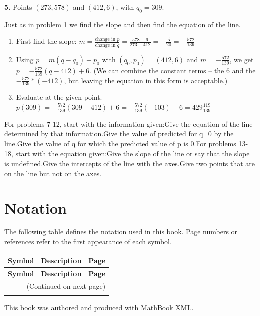 \documentclass[10pt,]{book}
\theoremstyle{plain}
\theoremstyle{definition}
\theoremstyle{definition}
\begin{document}
\par\smallskip
\noindent\textbf{5.}\quad{} Points \((273,578)\) and \((412,6)\), with \(q_0=309\).
%
\par\smallskip
Just as in problem 1 we find the slope and then find the equation of the line.%
\leavevmode%
\begin{enumerate}[label=(\alph*)]
\item\hypertarget{li-34}{}First find the slope: \(m=  \frac{\text{change in }p}{\text{change in }q}
=  \frac{578-6}{273-412}=-\frac{5}{20}=-\frac{572}{139}\)%
\item\hypertarget{li-35}{}Using \(p=m (q-q_0)+p_0\) with \((q_0,p_0 )=(412, 6)\) and \(m = -\frac{572}{139}\), we get \(p=-\frac{572}{139}(q-412)+6\).  (We can combine the constant terms – the \(6\) and the \(-\frac{572}{139}*(-412)\), but leaving the equation in this form is acceptable.)%
\item\hypertarget{li-36}{}Evaluate at the given point.  \(p(309)=-\frac{572}{139}(309-412)+6
=-\frac{572}{139}(-103)+6=429\frac{119}{139}\)%
\end{enumerate}
\par\smallskip
For problems 7-12, start with the information given:Give the equation of the line determined by that information.Give the value of predicted for q_0 by the line.Give the value of q for which the predicted value of p is 0.For problems 13-18, start with the equation given:Give the slope of the line or say that the slope is undefined.Give the intercepts of the line with the axes.Give two points that are on the line but not on the axes.\typeout{************************************************}
\typeout{************************************************}
\chapter[{Notation}]{Notation}\label{appendix-2}
\typeout{************************************************}
\typeout{************************************************}
The following table defines the notation used in this book. Page numbers or references refer to the first appearance of each symbol.%
\begin{longtable}[l]{lp{}r}
\textbf{Symbol}&\textbf{Description}&\textbf{Page}\\[1em]
\endfirsthead
\textbf{Symbol}&\textbf{Description}&\textbf{Page}\\[1em]
\endhead
\multicolumn{3}{r}{(Continued on next page)}\\
\endfoot
\endlastfoot
\end{longtable}
%
\backmatter
%
%
\printindex
%
\cleardoublepage
\pagestyle{empty}
\centerline{This book was authored and produced with \href{https://mathbook.pugetsound.edu}{MathBook XML}.%
}
\end{document}
